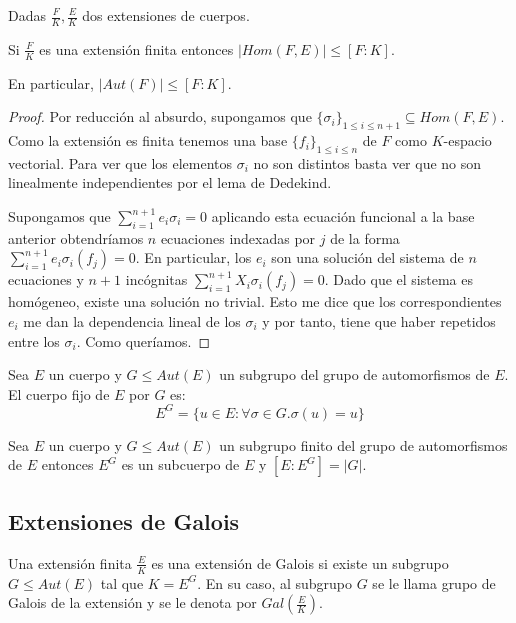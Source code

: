 \begin{corollary}
Dadas $\frac{F}{K},\frac{E}{K}$ dos extensiones de cuerpos.

Si $\frac{F}{K}$ es una extensión finita entonces $|Hom(F,E)| \le [F:K]$. 

En particular, $|Aut(F)| \le [F:K]$.
\end{corollary} 
\begin{proof}
Por reducción al absurdo, supongamos que $\{\sigma_i\}_{1 \le i \le n+1} \subseteq Hom(F,E)$. Como la extensión es finita tenemos una base $\{f_i\}_{1 \le i \le n}$ de $F$ como $K$-espacio vectorial. Para ver que los elementos $\sigma_i$ no son distintos basta ver que no son linealmente independientes por el lema de Dedekind. 

Supongamos que $\sum_{i = 1}^{n+1} e_i\sigma_i = 0$ aplicando esta ecuación funcional a la base anterior obtendríamos $n$ ecuaciones indexadas por $j$ de la forma $\sum_{i = 1}^{n+1} e_i\sigma_i(f_j) = 0$. En particular, los $e_i$ son una solución del sistema de $n$ ecuaciones y $n+1$ incógnitas $\sum_{i = 1}^{n+1} X_i\sigma_i(f_j) = 0$. Dado que el sistema es homógeneo, existe una solución no trivial. Esto me dice que los correspondientes $e_i$ me dan la dependencia lineal de los $\sigma_i$ y por tanto, tiene que haber repetidos entre los $\sigma_i$. Como queríamos. 
\end{proof}

\begin{definition}
Sea $E$ un cuerpo y $G \le Aut(E)$ un subgrupo del grupo de automorfismos de $E$. El cuerpo fijo de $E$ por $G$ es: $$E^G = \{u \in E:\forall \sigma \in G.\sigma(u) = u \}$$
\end{definition}

\begin{theorem}
Sea $E$ un cuerpo y $G \le Aut(E)$ un subgrupo finito del grupo de automorfismos de $E$ entonces $E^G$ es un subcuerpo de $E$ y $[E:E^G] = |G|$. 
\end{theorem}

\subsection{Extensiones de Galois}

\begin{definition}
Una extensión finita $\frac{E}{K}$ es una extensión de Galois si existe un subgrupo $G \le Aut(E)$ tal que $K = E^G$. En su caso, al subgrupo $G$ se le llama grupo de Galois de la extensión y se le denota por $Gal(\frac{E}{K})$. 
\end{definition}


